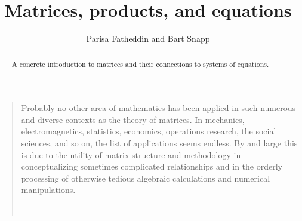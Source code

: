 \documentclass{ximera}
\author{Parisa Fatheddin and Bart Snapp}
\title{Matrices, products, and equations}
\begin{document}
\begin{abstract}
  A concrete introduction to matrices and their connections to systems
  of equations.
\end{abstract}
\maketitle

\begin{quote}
  Probably no other area of mathematics has been applied in such
  numerous and diverse contexts as the theory of matrices. In
  mechanics, electromagnetics, statistics, economics, operations
  research, the social sciences, and so on, the list of applications
  seems endless. By and large this is due to the utility of matrix
  structure and methodology in conceptualizing sometimes complicated
  relationships and in the orderly processing of otherwise tedious
  algebraic calculations and numerical manipulations.



  \hfill ---
\end{quote}
\end{document}
